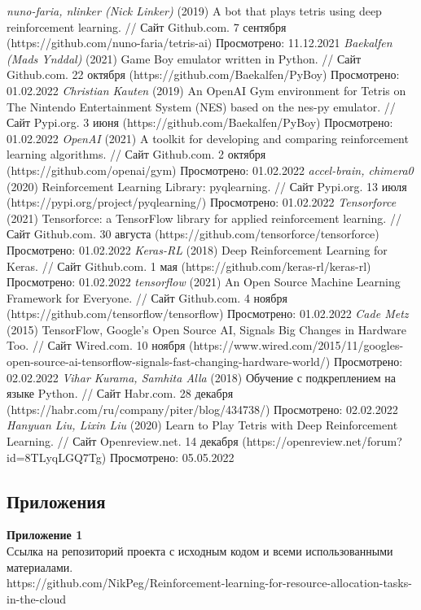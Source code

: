 \documentclass{article}
\newcommand\zz[1]{\par{\normalsize\strut #1} \hfill\ignorespaces}
\begin{document}
\begin{center}
\begin{thebibliography}{}
 \textit{nuno-faria, nlinker (Nick Linker)} (2019) A bot that plays tetris using deep reinforcement learning. // Сайт Github.com. 7 сентября (https://github.com/nuno-faria/tetris-ai) Просмотрено: 11.12.2021
 \textit{Baekalfen (Mads Ynddal)} (2021) Game Boy emulator written in Python. // Сайт Github.com. 22 октября (https://github.com/Baekalfen/PyBoy) Просмотрено: 01.02.2022
 \textit{Christian Kauten} (2019) An OpenAI Gym environment for Tetris on The Nintendo Entertainment System (NES) based on the nes-py emulator. // Сайт Pypi.org. 3 июня (https://github.com/Baekalfen/PyBoy) Просмотрено: 01.02.2022
 \textit{OpenAI} (2021) A toolkit for developing and comparing reinforcement learning algorithms. // Сайт Github.com. 2 октября (https://github.com/openai/gym) Просмотрено: 01.02.2022
 \textit{accel-brain, chimera0} (2020) Reinforcement Learning Library: pyqlearning. // Сайт Pypi.org. 13 июля (https://pypi.org/project/pyqlearning/) Просмотрено: 01.02.2022
 \textit{Tensorforce} (2021) Tensorforce: a TensorFlow library for applied reinforcement learning. // Сайт Github.com. 30 августа (https://github.com/tensorforce/tensorforce) Просмотрено: 01.02.2022
 \textit{Keras-RL} (2018) Deep Reinforcement Learning for Keras. // Сайт Github.com. 1 мая (https://github.com/keras-rl/keras-rl) Просмотрено: 01.02.2022
 \textit{tensorflow} (2021) An Open Source Machine Learning Framework for Everyone. // Сайт Github.com. 4 ноября (https://github.com/tensorflow/tensorflow) Просмотрено: 01.02.2022
 \textit{Cade Metz} (2015) TensorFlow, Google's Open Source AI, Signals Big Changes in Hardware Too. // Сайт Wired.com. 10 ноября (https://www.wired.com/2015/11/googles-open-source-ai-tensorflow-signals-fast-changing-hardware-world/) Просмотрено: 02.02.2022
 \textit{Vihar Kurama, Samhita Alla} (2018) Обучение с подкреплением на языке Python. // Сайт Habr.com. 28 декабря (https://habr.com/ru/company/piter/blog/434738/) Просмотрено: 02.02.2022
 \textit{Hanyuan Liu, Lixin Liu} (2020) Learn to Play Tetris with Deep Reinforcement Learning. // Сайт Openreview.net. 14 декабря (https://openreview.net/forum?id=8TLyqLGQ7Tg) Просмотрено: 05.05.2022
\end{thebibliography}
\end{center}
\newpage
\begin{center}
\section {Приложения}
\end{center}
\zz{}\textbf{Приложение 1\\}
Ссылка на репозиторий проекта с исходным кодом и всеми использованными материалами.\\
https://github.com/NikPeg/Reinforcement-learning-for-resource-allocation-tasks-in-the-cloud
\end{document}
